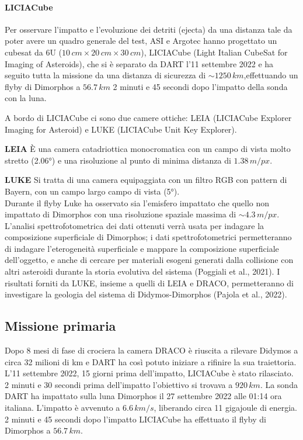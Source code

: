 \documentclass[a4paper,11pt,openright]{book}
\begin{document}
\paragraph*{LICIACube}
Per osservare l'impatto e l'evoluzione dei detriti (ejecta) da una distanza tale da poter avere un quadro generale del test, ASI e Argotec hanno progettato un cubesat da 6U ($10\,cm\times 20\,cm\times 30\,cm$), LICIACube (Light Italian CubeSat for Imaging of Asteroids), che si è separato da DART l'11 settembre 2022 e ha seguito tutta la missione da una distanza di sicurezza di $\sim 1250\,km$,effettuando un flyby di Dimorphos a $56.7\,km$ 2 minuti e 45 secondi dopo l'impatto della sonda con la luna.

A bordo di LICIACube ci sono due camere ottiche: LEIA (LICIACube Explorer Imaging for Asteroid) e LUKE (LICIACube Unit Key Explorer).

\qquad \small{\textbf{LEIA}} È una camera catadriottica monocromatica con un campo di vista molto stretto (2.06°) e una risoluzione al punto di minima distanza di $1.38\,m/px$.

\qquad \small{\textbf{LUKE}} Si tratta di una camera equipaggiata con un filtro RGB con pattern di Bayern, con un campo largo campo di vista (5°).\\
Durante il flyby Luke ha osservato sia l'emisfero impattato che quello non impattato di Dimorphos con una risoluzione spaziale massima di $\sim 4.3\,m/px$. L'analisi spettrofotometrica dei dati ottenuti verrà usata per indagare la composizione superficiale di Dimorphos; i dati spettrofotometrici permetteranno di indagare l'eterogeneità superficiale e mappare la composizione superficiale dell'oggetto, e anche di cercare per materiali esogeni generati dalla collisione con altri asteroidi durante la storia evolutiva del sistema (Poggiali et al., 2021). I risultati forniti da LUKE, insieme a quelli di LEIA e DRACO, permetteranno di investigare la geologia del sistema di Didymos-Dimorphos (Pajola et al., 2022).

\subsection{Missione primaria}
Dopo 8 mesi di fase di crociera la camera DRACO è riuscita a rilevare Didymos a circa 32 milioni di km e DART ha così potuto iniziare a rifinire la sua traiettoria. 
L'11 settembre 2022, 15 giorni prima dell'impatto, LICIACube è stato rilasciato. 2 minuti e 30 secondi prima dell'impatto l'obiettivo si trovava a $920\,km$. La sonda DART ha impattato sulla luna Dimorphos il 27 settembre 2022 alle 01:14 ora italiana.
L'impatto è avvenuto a $6.6\,km/s$, liberando circa 11 gigajoule di energia.
2 minuti e 45 secondi dopo l'impatto LICIACube ha effettuato il flyby di Dimorphos a $56.7\,km$.
\end{document}
